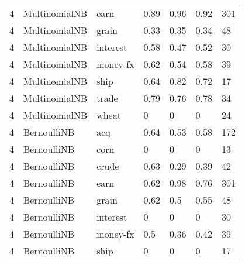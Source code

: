 \documentclass{article}
\begin{document}
\begin{table}[h]
\begin{tabular}{lllllll}
4             & MultinomialNB          & earn            & 0.89               & 0.96            & 0.92              & 301              \\
4             & MultinomialNB          & grain           & 0.33               & 0.35            & 0.34              & 48               \\
4             & MultinomialNB          & interest        & 0.58               & 0.47            & 0.52              & 30               \\
4             & MultinomialNB          & money-fx        & 0.62               & 0.54            & 0.58              & 39               \\
4             & MultinomialNB          & ship            & 0.64               & 0.82            & 0.72              & 17               \\
4             & MultinomialNB          & trade           & 0.79               & 0.76            & 0.78              & 34               \\
4             & MultinomialNB          & wheat           & 0                  & 0               & 0                 & 24               \\
4             & BernoulliNB            & acq             & 0.64               & 0.53            & 0.58              & 172              \\
4             & BernoulliNB            & corn            & 0                  & 0               & 0                 & 13               \\
4             & BernoulliNB            & crude           & 0.63               & 0.29            & 0.39              & 42               \\
4             & BernoulliNB            & earn            & 0.62               & 0.98            & 0.76              & 301              \\
4             & BernoulliNB            & grain           & 0.62               & 0.5             & 0.55              & 48               \\
4             & BernoulliNB            & interest        & 0                  & 0               & 0                 & 30               \\
4             & BernoulliNB            & money-fx        & 0.5                & 0.36            & 0.42              & 39               \\
4             & BernoulliNB            & ship            & 0                  & 0               & 0                 & 17               \\

\end{tabular}
\end{table}
\end{document}
